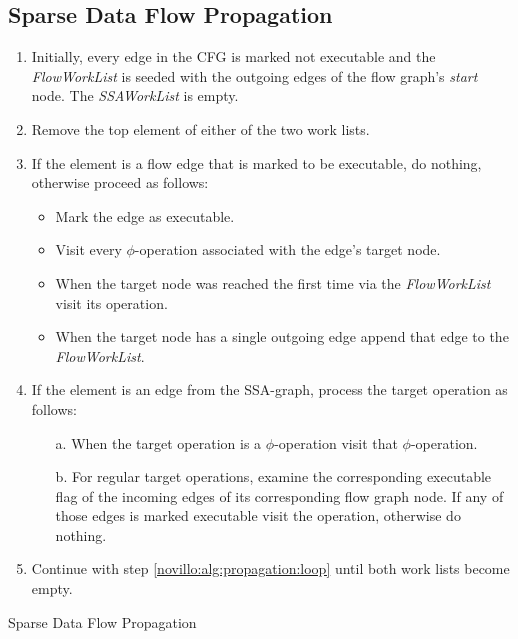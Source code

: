 \subsection{Sparse Data Flow Propagation}

\begin{algorithm}[t!]
  \begin{enumerate}
    \item Initially, every edge in the CFG is marked not executable and the
          \emph{FlowWorkList} is seeded with the outgoing edges of the flow
          graph's \emph{start} node.  The \emph{SSAWorkList} is empty.
    \item \label{novillo:alg:propagation:loop} Remove the top element of either
          of the two work lists.
    \item \label{novillo:alg:propagation:flowedge} If the element is a flow edge
          that is marked to be executable, do nothing, \\ otherwise proceed as
          follows:
          \begin{itemize}
            \item Mark the edge as executable.
            \item Visit every $\phi$-operation associated with the edge's target
                  node.
            \item When the target node was reached the first time via the
                  \emph{FlowWorkList} visit its operation.
            \item When the target node has a single outgoing edge append that
                  edge to the \emph{FlowWorkList}.
          \end{itemize}
    \item \label{novillo:alg:propagation:ssaedge} If the element is an edge from
          the SSA-graph, process the target operation as follows:
          \begin{enumerate}
            \item[a.] When the target operation is a $\phi$-operation visit that
                      $\phi$-operation.
            \item[b.] \label{novillo:alg:propagation:ssaedge:regular} For
                      regular target operations, examine the corresponding
                      executable flag of the incoming edges of its corresponding
                      flow graph node. If any of those edges is marked
                      executable visit the operation, otherwise do nothing.
          \end{enumerate}
    \item Continue with step \ref{novillo:alg:propagation:loop} until both work
          lists become empty.
    \vspace{-1em}
  \end{enumerate}

  \caption{Sparse Data Flow Propagation}
  \label{novillo:alg:propagation}
\end{algorithm}

